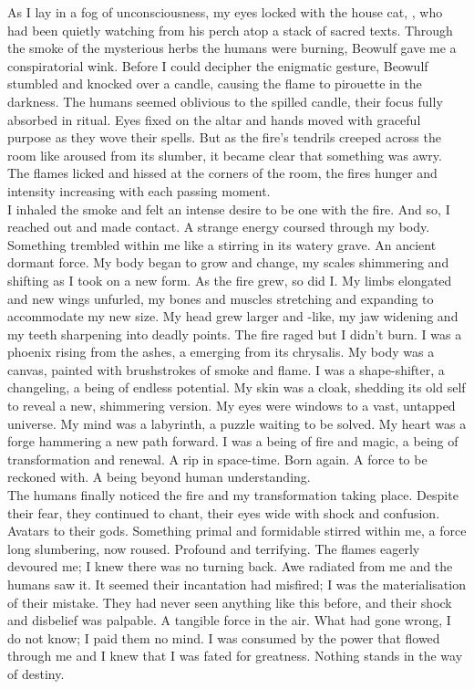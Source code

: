 As I lay in a fog of unconsciousness, my eyes locked with the house cat, , who had been quietly watching from his perch atop a stack of sacred texts. Through the smoke of the mysterious herbs the humans were burning, Beowulf gave me a conspiratorial wink. Before I could decipher the enigmatic gesture, Beowulf stumbled and knocked over a candle, causing the flame to pirouette in the darkness. The humans seemed oblivious to the spilled candle, their focus fully absorbed in ritual. Eyes fixed on the altar and hands moved with graceful purpose as they wove their spells. But as the fire's tendrils creeped across the room like aroused from its slumber, it became clear that something was awry. The flames licked and hissed at the corners of the room, the fires hunger and intensity increasing with each passing moment. \\

I inhaled the smoke and felt an intense desire to be one with the fire. And so, I reached out and made contact. A strange energy coursed through my body. Something trembled within me like a  stirring in its watery grave. An ancient dormant force. My body began to grow and change, my scales shimmering and shifting as I took on a new form. As the fire grew, so did I. My limbs elongated and new wings unfurled, my bones and muscles stretching and expanding to accommodate my new size. My head grew larger and -like, my jaw widening and my teeth sharpening into deadly points. The fire raged but I didn't burn. I was a phoenix rising from the ashes, a  emerging from its chrysalis. My body was a canvas, painted with brushstrokes of smoke and flame. I was a shape-shifter, a changeling, a being of endless potential. My skin was a cloak, shedding its old self to reveal a new, shimmering version. My eyes were windows to a vast, untapped universe. My mind was a labyrinth, a puzzle waiting to be solved. My heart was a forge hammering a new path forward. I was a being of fire and magic, a being of transformation and renewal. A rip in space-time. Born again. A force to be reckoned with. A being beyond human understanding. \\

The humans finally noticed the fire and my transformation taking place. Despite their fear, they continued to chant, their eyes wide with shock and confusion. Avatars to their gods. Something primal and formidable stirred within me, a force long slumbering, now roused. Profound and terrifying. The flames eagerly devoured me; I knew there was no turning back. Awe radiated from me and the humans saw it. It seemed their incantation had misfired; I was the materialisation of their mistake. They had never seen anything like this before, and their shock and disbelief was palpable. A tangible force in the air. What had gone wrong, I do not know; I paid them no mind. I was consumed by the power that flowed through me and I knew that I was fated for greatness. Nothing stands in the way of destiny. \\

